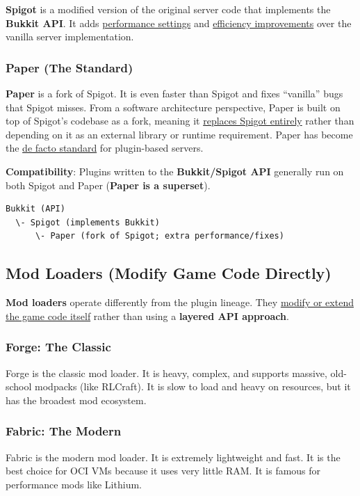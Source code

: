 \documentclass{article}
\begin{document}
\textbf{Spigot} is a modified version of the original server code that implements the \textbf{Bukkit API}. It adds \uline{performance settings} and \uline{efficiency improvements} over the vanilla server implementation.

\subsubsection{Paper (The Standard)}

\textbf{Paper} is a fork of Spigot. It is even faster than Spigot and fixes ``vanilla'' bugs that Spigot misses. From a software architecture perspective, Paper is built on top of Spigot's codebase as a fork, meaning it \uline{replaces Spigot entirely} rather than depending on it as an external library or runtime requirement. Paper has become the \uline{de facto standard} for plugin-based servers.

\textbf{Compatibility}: Plugins written to the \textbf{Bukkit/Spigot API} generally run on both Spigot and Paper (\textbf{Paper is a superset}).

\begin{verbatim}
Bukkit (API)
  \- Spigot (implements Bukkit)
      \- Paper (fork of Spigot; extra performance/fixes)
\end{verbatim}

\newpage
\subsection{Mod Loaders (Modify Game Code Directly)}

\textbf{Mod loaders} operate differently from the plugin lineage. They \uline{modify or extend the game code itself} rather than using a \textbf{layered API approach}.

\subsubsection{Forge: The Classic}

Forge is the classic mod loader. It is heavy, complex, and supports massive, old-school modpacks (like RLCraft). It is slow to load and heavy on resources, but it has the broadest mod ecosystem.

\subsubsection{Fabric: The Modern}

Fabric is the modern mod loader. It is extremely lightweight and fast. It is the best choice for OCI VMs because it uses very little RAM. It is famous for performance mods like Lithium.
\end{document}
